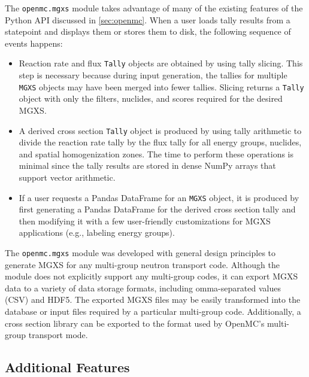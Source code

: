 The \texttt{openmc.mgxs} module takes advantage of many of the existing features of the Python API discussed in \cref{sec:openmc}. When a user loads tally results from a statepoint and displays them or stores them to disk, the following sequence of events happens:

\begin{itemize}[noitemsep]
\item Reaction rate and flux \texttt{Tally} objects are obtained by using tally slicing. This step is necessary because during input generation, the tallies for multiple \texttt{MGXS} objects may have been merged into fewer tallies. Slicing returns a \texttt{Tally} object with only the filters, nuclides, and scores required for the desired MGXS.
\item A derived cross section \texttt{Tally} object is produced by using tally arithmetic to divide the reaction rate tally by the flux tally for all energy groups, nuclides, and spatial homogenization zones. The time to perform these operations is minimal since the tally results are stored in dense NumPy arrays that support vector arithmetic.
\item If a user requests a Pandas DataFrame for an \texttt{MGXS} object, it is produced by first generating a Pandas DataFrame for the derived cross section tally and then modifying it with a few user-friendly customizations for MGXS applications (\textrm{e.g.}, labeling energy groups).
\end{itemize}

The \texttt{openmc.mgxs} module was developed with general design principles to generate MGXS for any multi-group neutron transport code. Although the module does not explicitly support any multi-group codes, it can export MGXS data to a variety of data storage formats, including omma-separated values (CSV) and HDF5. The exported MGXS files may be easily transformed into the database or input files required by a particular multi-group code. Additionally, a cross section library can be exported to the format used by OpenMC's multi-group transport mode.

\subsection{Additional Features}
\label{sec:features}


